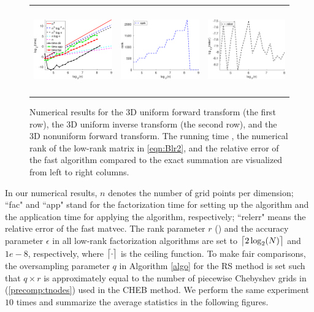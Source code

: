 \documentclass[11pt]{article}
\DeclarePairedDelimiter{\ceil}{\lceil}{\rceil}
\begin{document}
\begin{figure}[ht!]
\begin{center}
\begin{tabular}{ccc}
      \\
      \includegraphics[height=1.45in]{pic/testNJPT3D_time.eps}&
      \includegraphics[height=1.45in]{pic/testNJPT3D_rank.eps}&
      \includegraphics[height=1.45in]{pic/testNJPT3D_err.eps}\\
    \end{tabular}
  \end{center}
\caption{Numerical results for the 3D uniform forward transform (the first row), the 3D uniform inverse transform (the second row), and the 3D nonuniform forward transform. The running time  {\color{blue}{(in second)}}, the numerical rank of the low-rank matrix in \eqref{eqn:Blr2}, and the relative error of the fast algorithm compared to the exact summation are visualized from left to right columns.}
\label{fig:3D}
\end{figure}

In our numerical results, $n$ denotes the number of grid points per dimension; ``fac" and ``app" stand for the factorization time for setting up the algorithm and the application time for applying the algorithm, respectively; ``relerr" means the relative error of the fast matvec. The rank parameter $r$ ({\color{blue}{the upper bound of the rank for each dimension of a low rank factorization}}) and the accuracy parameter $\epsilon$ in all low-rank factorization algorithms are set to $\ceil[\big]{2\log_2(N)}$ and $1e-8$, respectively, where $\ceil[\big]{\cdot}$ is the ceiling function. To make fair comparisons, the oversampling parameter $q$ in Algorithm \ref{algo} for the RS method is set such that $q\times r$ is approximately equal to the number of piecewise Chebyshev grids in  (\ref{precomp:tnodes}) used in the CHEB method. We perform the same experiment $10$ times and summarize the average statistics in the following figures. {\color{blue}{All timings are measured in seconds.}}
\end{document}
